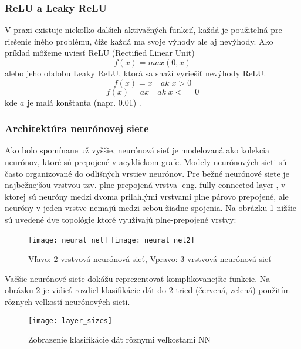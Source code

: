 \subsubsection{ReLU a Leaky ReLU}
V praxi existuje niekoľko dalšich aktivačných funkcií, každá je použitelná pre riešenie iného problému,
    čiže každá ma svoje výhody ale aj nevýhody.
Ako príklad môžeme uviesť ReLU (Rectified Linear Unit)
\begin{equation}
    f(x) = max(0,x)
\end{equation}
alebo jeho obdobu Leaky ReLU, ktorá sa snaží vyriešiť nevýhody ReLU.
\begin{equation}
    f(x) = x \quad ak \; x > 0
\end{equation}
\begin{equation}
    f(x) = ax \quad ak \; x <= 0
\end{equation}
kde $a$ je malá konštanta (napr. 0.01) \cite{odkaz:ConvolutionalNeuralNetworkCS231n}.

\subsubsection{Architektúra neurónovej siete}
Ako bolo spomínane už vyššie, neurónová sieť je modelovaná ako kolekcia neurónov, ktoré sú prepojené v acyklickom grafe.
Modely neurónových sieti sú často organizované do odlišných vrstiev neurónov.
Pre bežné neurónové siete je najbežnejšou vrstvou tzv. plne-prepojená vrstva [eng. fully-connected layer],
    v ktorej sú neuróny medzi dvoma priľahlými vrstvami plne párovo prepojené, ale neuróny v jeden vrstve nemajú medzi sebou žiadne spojenia.
Na obrázku \ref{pic:NeuralNetworkArchitecture} nižšie sú uvedené dve topológie ktoré využívajú plne-prepojené vrstvy\cite{odkaz:ConvolutionalNeuralNetworkCS231n}:
\begin{figure}[H]
    \centering
    \texttt{[image: neural\_net]}
    \qquad
    \texttt{[image: neural\_net2]}
    \caption{Vľavo: 2-vrstvová neurónová sieť, Vpravo: 3-vrstvová neurónová sieť \cite{odkaz:ConvolutionalNeuralNetworkCS231n}}
    \label{pic:NeuralNetworkArchitecture}
\end{figure}

Vačšie neurónové sieťe dokážu reprezentovať komplikovanejšie funkcie.
Na obrázku \ref{pic:XNNLayerExample} je vidieť rozdiel klasifikácie dát do 2 tried (červená, zelená) použitím rôznych veľkostí neurónových sieti.
\begin{figure}[H]
	\centering
	\texttt{[image: layer\_sizes]}
	\caption{Zobrazenie klasifikácie dát rôznymi veľkostami NN \cite{odkaz:ConvolutionalNeuralNetworkCS231n}}
	\label{pic:XNNLayerExample}
\end{figure}

